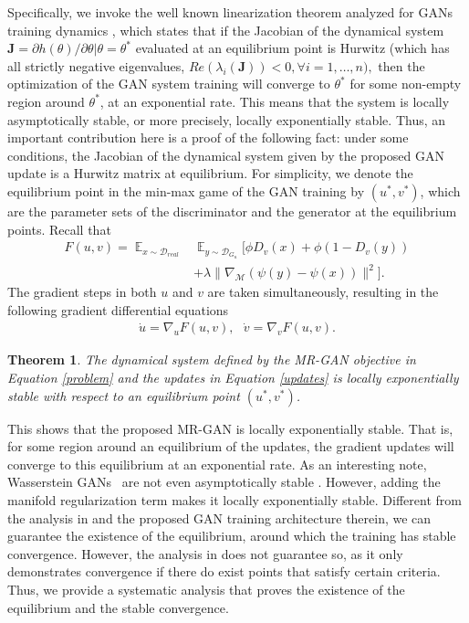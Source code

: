 \documentclass[10pt,twocolumn,letterpaper]{article}
\newcommand{\nn}{\nonumber}
\newcommand{\g}{{G_u}}
\newcommand{\di}{{D_v}}
\newcommand{\D}{\mathcal{D}}
\newcommand{\E}{\mathbb{E}}
\newcommand{\M}{\mathcal{M}}
\newtheorem{thm}{Theorem}
\begin{document}
Specifically, we invoke the well known linearization theorem \cite{khalil1996noninear} analyzed for GANs training dynamics \cite{nagarajan2017gradient}, which states that if the Jacobian of the dynamical
system $\mathbf{J} = \partial h(\theta)/\partial \theta|\theta=\theta^\ast$ evaluated at an equilibrium point is Hurwitz (which has all strictly negative
eigenvalues, $Re(\lambda_i(\mathbf J)) < 0, \forall i = 1, \ldots , n),$ then the optimization of the GAN system training will converge to $\theta^\ast$	for some non-empty region around $\theta^\ast$, at an exponential rate. This means that the system is locally asymptotically stable, or more precisely, locally exponentially stable.
Thus, an important contribution here is a proof of the following fact: under some
conditions, the Jacobian of the dynamical system given by the proposed GAN update is a Hurwitz matrix at equilibrium. For simplicity, we denote the equilibrium point in the min-max game of the GAN training by $(u^\ast, v^\ast)$, which are the parameter sets of the discriminator and the generator at the equilibrium points. Recall that
\begin{align}
F(u,v)= \mathop{\E}_{x\sim \D_{real}}&\mathop{\E}_{y\sim \D_{\g}}[\phi \di(x)+ \phi(1-\di(y))\nn\\&+\lambda \|\nabla_\M (\psi(y)-\psi(x))\|^2].
\end{align}
The gradient steps in both $u$ and $v$ are taken simultaneously, resulting in the following gradient differential equations
\begin{align}\label{updates}
\dot{u} = \nabla_u F(u,v), \ \ \ \dot{v} = \nabla_v F(u,v).
\end{align}


\begin{thm}\label{thm_stable}
	The dynamical system defined by the MR-GAN objective in Equation \eqref{problem} and the updates in
	Equation \eqref{updates} is locally exponentially stable with respect to an equilibrium point $(u^\ast, v^\ast)$.
\end{thm}
This shows that the proposed MR-GAN is locally exponentially stable. That is, for some region around an equilibrium of the updates, the gradient updates will converge
to this equilibrium at an exponential rate. As an interesting note, Wasserstein GANs~\cite{arjovsky2017wasserstein} are not even asymptotically stable \cite{nagarajan2017gradient}. However, adding the manifold regularization term makes it locally exponentially stable.
Different from the analysis in \cite{nagarajan2017gradient} and the proposed GAN training architecture therein, we can guarantee the existence of the equilibrium, around which the training has stable convergence. However, the analysis in \cite{nagarajan2017gradient} does not guarantee so, as it only demonstrates convergence if there do exist points that satisfy certain criteria. Thus, we provide a systematic analysis that proves the existence of the equilibrium and the stable convergence.
\end{document}
